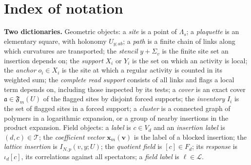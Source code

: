 
\section*{Index of notation}
\begingroup
\small
\setlength{\parindent}{0pt}
\setlength{\parskip}{2pt}
\textbf{Two dictionaries.} Geometric objects: a \emph{site} is a point of $\Lambda_s$; a \emph{plaquette} is an elementary square, with holonomy $U_{y;ab}$; a \emph{path} is a finite chain of links along which curvatures are transported; the \emph{stencil} $y+\Sigma_v$ is the finite site set an insertion depends on; the \emph{support} $X_i$ or $Y_i$ is the set on which an activity is local; the \emph{anchor} $o_i\in X_i$ is the site at which a regular activity is counted in its weighted sum; the \emph{complete read support} consists of all links and flags a local term depends on, including those inspected by its tests; a \emph{cover} is an exact cover $\mathfrak a\in\mathfrak F_m(U)$ of the flagged sites by disjoint forced supports; the \emph{inventory} $I_i$ is the set of flagged sites in a forced support; a \emph{cluster} is a connected graph of polymers in a logarithmic expansion, or a group of nearby insertions in the product expansion. Field objects: a \emph{label} is $c\in V_d$ and an \emph{insertion label} is $(d,c)\in\mathcal T$; the \emph{coefficient vector} $\mathbf x_m(\mathbf v)$ is the label of a blocked insertion; the \emph{lattice insertion} is $I_{N,p}(v,y;U)$; the \emph{quotient field} is $[c]\in F_d$; its \emph{response} is $\iota_d[c]$, its correlations against all spectators; a \emph{field label} is $\ell\in\mathcal L$.
\endgroup

